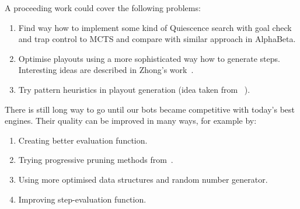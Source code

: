 A proceeding work could cover the following problems:

\begin{enumerate}
\item Find way how to implement some kind of Quiescence search with goal check and trap control to MCTS and compare with similar approach in AlphaBeta.
\item Optimise playouts using a more sophisticated way how to generate steps. Interesting ideas are described in Zhong's work~\cite{ZHONG}.
\item Try pattern heuristics in playout generation (idea taken from ~\cite{PatternsGo,PatternsArimaa}).
\end{enumerate}

\noindent There is still long way to go until our bots became competitive with
today's best engines. Their quality can be improved in many ways, for example
by:
\begin{enumerate}
\item Creating better evaluation function.
\item Trying progressive pruning methods from~\cite{progressive-strategies,
MonteCarloGo}.
\item Using more optimised data structures and random number generator.
\item Improving step-evaluation function.
\end{enumerate}
